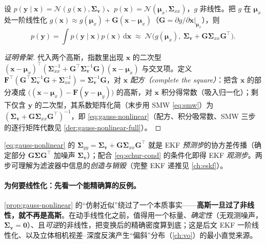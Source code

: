 \begin{proposition}\label{prop:gauss-nonlinear}
设 $p(\mathbf{y}\mid\mathbf{x})=\mathcal{N}(g(\mathbf{x}),\boldsymbol{\Sigma}_{\mathbf{v}})$、$p(\mathbf{x})=\mathcal{N}(\boldsymbol{\mu}_x,\boldsymbol{\Sigma}_{xx})$，$g$ 非线性。把 $g$ 在 $\boldsymbol{\mu}_x$ 处一阶线性化 $g(\mathbf{x})\approx g(\boldsymbol{\mu}_x)+\mathbf{G}(\mathbf{x}-\boldsymbol{\mu}_x)$（$\mathbf{G}=\partial g/\partial\mathbf{x}|_{\boldsymbol{\mu}_x}$），则
\begin{equation}
  p(\mathbf{y})=\int p(\mathbf{y}\mid\mathbf{x})p(\mathbf{x})\,\mathrm{d}\mathbf{x}
  \;\approx\;\mathcal{N}\big(g(\boldsymbol{\mu}_x),\ \boldsymbol{\Sigma}_{\mathbf{v}}+\mathbf{G}\boldsymbol{\Sigma}_{xx}\mathbf{G}^\top\big).
  \label{eq:gauss-nonlinear}
\end{equation}
\end{proposition}
\begin{proof}[证明骨架]
代入两个高斯，指数里出现 $\mathbf{x}$ 的二次型 $(\mathbf{x}-\boldsymbol{\mu}_x)^\top(\boldsymbol{\Sigma}_{xx}^{-1}+\mathbf{G}^\top\boldsymbol{\Sigma}_{\mathbf{v}}^{-1}\mathbf{G})(\mathbf{x}-\boldsymbol{\mu}_x)$ 与交叉项。定义 $\mathbf{F}^\top(\mathbf{G}^\top\boldsymbol{\Sigma}_{\mathbf{v}}^{-1}\mathbf{G}+\boldsymbol{\Sigma}_{xx}^{-1})=\boldsymbol{\Sigma}_{\mathbf{v}}^{-1}\mathbf{G}$，对 $\mathbf{x}$ \emph{配方（complete the square）}：把含 $\mathbf{x}$ 的部分凑成 $\big((\mathbf{x}-\boldsymbol{\mu}_x)-\mathbf{F}(\mathbf{y}-\boldsymbol{\mu}_y)\big)$ 的高斯，对 $\mathbf{x}$ 积分得常数（吸入归一化）；剩下仅含 $\mathbf{y}$ 的二次型，其系数矩阵化简（末步用 SMW \cref{eq:smw}）为 $(\boldsymbol{\Sigma}_{\mathbf{v}}+\mathbf{G}\boldsymbol{\Sigma}_{xx}\mathbf{G}^\top)^{-1}$，即 \cref{eq:gauss-nonlinear}（配方、积分吸常数、SMW 三步的逐行矩阵代数见 \cref{der:gauss-nonlinear-full}）。
\end{proof}
\noindent \cref{eq:gauss-nonlinear} 的 $\boldsymbol{\Sigma}_{yy}=\boldsymbol{\Sigma}_{\mathbf{v}}+\mathbf{G}\boldsymbol{\Sigma}_{xx}\mathbf{G}^\top$ 就是 EKF \emph{预测步}的协方差传播（确定部分 $\mathbf{G}\boldsymbol{\Sigma}\mathbf{G}^\top$ 加噪声 $\boldsymbol{\Sigma}_{\mathbf{v}}$）；配合 \cref{eq:schur-cond} 的条件化即得 EKF \emph{观测步}。两步可理解为滤波器中信息的\emph{创造与销毁}\cite{barfoot2024state}（完整 EKF 递推见 \cref{ch:eskf}）。

\paragraph{为何要线性化：先看一个能精确算的反例。}
\cref{prop:gauss-nonlinear} 的“仿射近似”绕过了一个本质事实——\textbf{高斯一旦过了非线性，就不再是高斯}。在动手线性化之前，值得用一个标量、\emph{确定性}（无观测噪声，$\boldsymbol{\Sigma}_{\mathbf{v}}=\mathbf{0}$）、且\emph{可逆}的非线性，把变换后的精确密度算到底；这是后文 EKF 一阶线性化、以及立体相机视差–深度反演产生“偏斜”分布（\cref{ch:vo}）的最小直觉来源。

